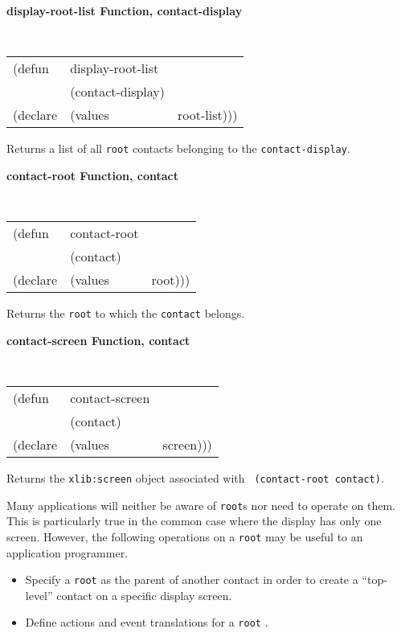 {\samepage
{\large {\bf display-root-list \hfill Function, contact-display}}
\begin{flushright} \parbox[t]{6.125in}{
\tt
\begin{tabular}{lll}
\raggedright
(defun & display-root-list & \\ 
& (contact-display) \\
(declare &(values  & root-list)))
\end{tabular}
\rm

}\end{flushright}
}

\begin{flushright} \parbox[t]{6.125in}{
Returns a list of all {\tt root} contacts belonging to the {\tt contact-display}.
}\end{flushright}


{\samepage
{\large {\bf contact-root \hfill Function, contact}}
\begin{flushright} \parbox[t]{6.125in}{
\tt
\begin{tabular}{lll}
\raggedright
(defun & contact-root & \\ 
& (contact) \\
(declare &(values  & root)))
\end{tabular}
\rm

Returns the {\tt root} to which the {\tt contact} belongs. 
}\end{flushright}}

{\samepage
{\large {\bf contact-screen \hfill Function, contact}}
\begin{flushright} \parbox[t]{6.125in}{
\tt
\begin{tabular}{lll}
\raggedright
(defun & contact-screen & \\ 
& (contact) \\
(declare &(values  & screen)))
\end{tabular}
\rm

Returns the {\tt xlib:screen} object associated with {\tt
(contact-root contact)}. 
}\end{flushright}}



Many applications will neither be aware of {\tt root}s nor need  to
operate on them. This is particularly true in the common case where the display
has only one screen.
However, the following operations on a {\tt root}
may be useful to an application programmer. 
\begin{itemize}
\item Specify a {\tt root} as the parent of another contact in order
to create a ``top-level'' contact on a specific display screen.
\item Define actions and event translations for a {\tt root}
\footnotemark{}.  
\end{itemize}

